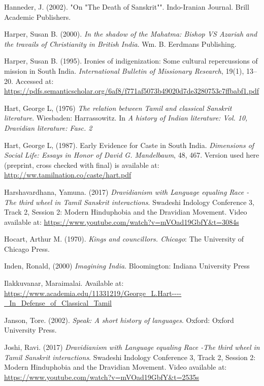 \begin{thebibliography}{99}
  Hanneder, J. (2002). "On "The Death of Sanskrit"". Indo-Iranian Journal. Brill Academic Publishers.

  Harper, Susan B. (2000). \textit{In the shadow of the Mahatma: Bishop VS Azariah and the travails of Christianity in British India}. Wm. B. Eerdmans Publishing.

  Harper, Susan B. (1995). Ironies of indigenization: Some cultural repercussions of mission in South India. \textit{International Bulletin of Missionary Research}, 19(1), 13–20. Accessed at: \url{https://pdfs.semanticscholar.org/6af8/f771af5073b49020d7de3280753c7ffbabf1.pdf}

  Hart, George L, (1976) \textit{The relation between Tamil and classical Sanskrit literature}. Wiesbaden: Harrassowitz. In \textit{A history of Indian literature: Vol. 10, Dravidian literature: Fasc. 2}

  Hart, George L, (1987). Early Evidence for Caste in South India. \textit{Dimensions of Social Life: Essays in Honor of David G. Mandelbaum}, 48, 467. Version used here (preprint, cross checked with final) is available at: \url{http://ww.tamilnation.co/caste/hart.pdf}

  Harshavardhana, Yamuna. (2017) \textit{Dravidianism with Language equaling Race -The third wheel in Tamil Sanskrit interactions}. Swadeshi Indology Conference 3, Track 2, Session 2: Modern Hinduphobia and the Dravidian Movement. Video available at: \url{https://www.youtube.com/watch?v=mVOad19GbfY&t=3084s}

  Hocart, Arthur M. (1970). \textit{Kings and councillors. Chicago}: The University of Chicago Press.

  Inden, Ronald, (2000) \textit{Imagining India}. Bloomington: Indiana University Press

  Ilakkuvanar, Maraimalai. Available at: \url{https://www.academia.edu/11331219/George_L.Hart----_In_Defense_of_Classical_Tamil}

  Janson, Tore. (2002). \textit{Speak: A short history of languages}. Oxford: Oxford University Press.

  Joshi, Ravi. (2017) \textit{Dravidianism with Language equaling Race -The third wheel in Tamil Sanskrit interactions}. Swadeshi Indology Conference 3, Track 2, Session 2: Modern Hinduphobia and the Dravidian Movement. Video available at: \url{https://www.youtube.com/watch?v=mVOad19GbfY&t=2535s}


\end{thebibliography}
